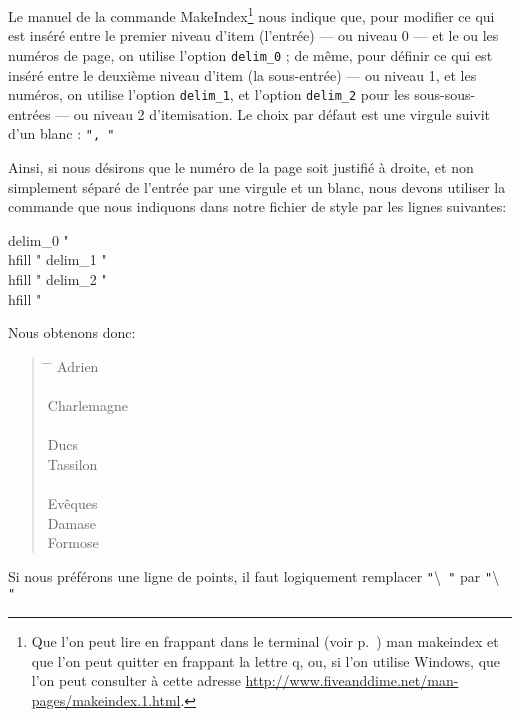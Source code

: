 Le manuel de la commande MakeIndex\footnote{Que l'on peut lire en frappant dans le terminal (voir p.~\pageref{terminal}) {\ttfamily man makeindex} et que l'on peut quitter en frappant la lettre  {\ttfamily q}, ou, si l'on utilise Windows, que l'on peut consulter à cette adresse \url{http://www.fiveanddime.net/man-pages/makeindex.1.html}.} nous indique que, pour modifier ce qui est inséré entre le premier niveau d'item (l'entrée) --- ou niveau 0 --- et le ou les numéros de page, on utilise l'option \verb|delim_0| ; de même, pour définir ce qui est inséré entre le deuxième niveau d'item (la sous-entrée) --- ou niveau 1, et les numéros, on utilise l'option \verb+delim_1+, et l'option \verb|delim_2| pour les sous-sous-entrées --- ou niveau 2 d'itemisation. Le choix par défaut est une virgule suivit d'un blanc : \verb|", "|

Ainsi, si nous désirons que le numéro de la page soit justifié à droite, et non simplement séparé de l'entrée par une virgule et un blanc, nous devons utiliser la commande  que nous indiquons dans notre fichier de style par les lignes suivantes:

\begin{latexcode}
delim_0 "\\hfill "
delim_1 "\\hfill "
delim_2 "\\hfill "
\end{latexcode}

Nous obtenons donc: 

\begin{quotation}
\begin{tabbing}
\hspace{0,5cm}  \=  \hspace{3cm} \= \kill
Adrien\> \\
\\
Charlemagne \> \\
\\
Ducs \\
\> Tassilon\\
\\
Evêques \\
\> Damase \\
\> Formose\\
\end{tabbing}
\end{quotation}

Si nous préférons une ligne de points, il faut logiquement remplacer \verb|"|\textbackslash{}\verb| "| par \verb|"|\textbackslash{}\verb| "|

